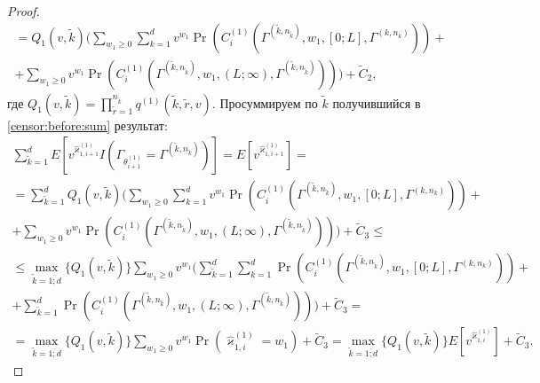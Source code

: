 \documentclass{report}
\begin{document}
\begin{proof}
\begin{multline}
  = Q_1(v,\tilde{k})  \biggl(\sum_{w_1\geqslant 0} \sum_{k=1}^d v^{w_1} \Pr(C_i^{(1)}(\Gamma^{(\tilde{k},n_{\tilde{k}})},w_1,[0;L],\Gamma^{(k,n_k)} )) + \\
   + \sum_{w_1\geqslant 0}  v^{w_1} \Pr(C_i^{(1)}(\Gamma^{(\tilde{k},n_{\tilde{k}})},w_1,(L;\infty),\Gamma^{(\tilde{k},n_{\tilde{k}})} ))\biggr) + \widetilde{C}_2,
   \label{censor:before:sum}
  \end{multline}
где $Q_1(v,\tilde{k})= \prod_{\tilde{r}=1}^{n_{\tilde{k}}} q^{(1)}(\tilde{k},\tilde{r},v) $. Просуммируем по $\tilde{k}$ получившийся в \eqref{censor:before:sum} результат:
\allowdisplaybreaks
\begin{multline*}
\sum_{\tilde{k}=1}^d E[v^{\hat{\varkappa}_{1,i+1}^{(1)}} I(\Gamma_{\theta_{i+1}^{(1)}}= \Gamma^{(\tilde{k},n_{\tilde{k}})})]=   E[v^{\hat{\varkappa}_{1,i+1}^{(1)}} ]=\\
  = \sum_{\tilde{k}=1}^d Q_1(v,\tilde{k})  \biggl(\sum_{w_1\geqslant 0} \sum_{k=1}^d v^{w_1} \Pr(C_i^{(1)}(\Gamma^{(\tilde{k},n_{\tilde{k}})},w_1,[0;L],\Gamma^{(k,n_k)} )) + \\
   + \sum_{w_1\geqslant 0}  v^{w_1} \Pr(C_i^{(1)}(\Gamma^{(\tilde{k},n_{\tilde{k}})},w_1,(L;\infty),\Gamma^{(\tilde{k},n_{\tilde{k}})} ))\biggr) + \widetilde{C}_3 \leqslant \\ \leqslant
   \max_{ \tilde{k}=\overline{1;d} }{\{Q_1(v,\tilde{k}) \}} \sum_{w_1\geqslant 0}  v^{w_1} \biggl(\sum_{\tilde{k}=1}^d \sum_{k=1}^d  \Pr(C_i^{(1)}(\Gamma^{(\tilde{k},n_{\tilde{k}})},w_1,[0;L],\Gamma^{(k,n_k)} )) + \\
   +  \sum_{\tilde{k}=1}^d \Pr(C_i^{(1)}(\Gamma^{(\tilde{k},n_{\tilde{k}})},w_1,(L;\infty),\Gamma^{(\tilde{k},n_{\tilde{k}})} ))\biggr) + \widetilde{C}_3 = \\
   =\max_{ \tilde{k}=\overline{1;d} }{\{Q_1(v,\tilde{k}) \}} \sum_{w_1\geqslant 0}  v^{w_1} \Pr(\hat{\varkappa}_{1,i}^{(1)}=w_1)+ \widetilde{C}_3=\max_{ \tilde{k}=\overline{1;d} }{\{Q_1(v,\tilde{k}) \}} E[v^{\hat{\varkappa}_{1,i}^{(1)}} ]+ \widetilde{C}_3.
  \end{multline*}


\end{proof}
\end{document}
